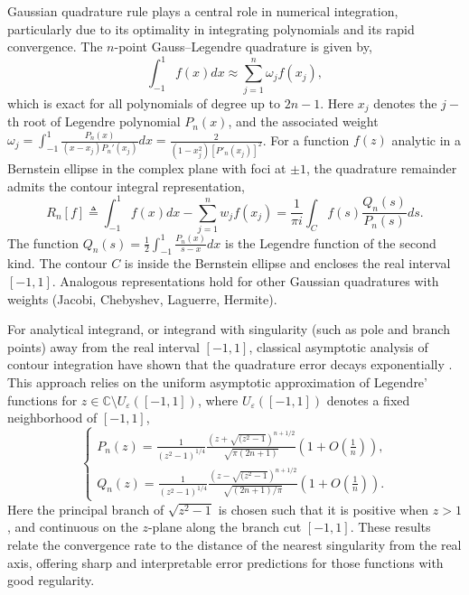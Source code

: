 \documentclass[11pt]{article}
\begin{document}
Gaussian quadrature rule plays a central role in numerical integration, particularly due to its optimality in integrating polynomials and its rapid convergence. The $n$-point Gauss--Legendre quadrature is given by,
\begin{equation}
    \int_{-1}^1 f(x) dx \approx \sum_{j=1}^n \omega_j f(x_j),
\end{equation}
which is exact for all polynomials of degree up to $2n-1$. Here $x_j$ denotes the $j-$th root of Legendre polynomial $P_n(x)$, and the associated weight $\omega_j = \int_{-1}^1 \frac{P_n(x)}{(x - x_j) P_n'(x_j)} dx =  \frac{2}{(1-x_j^2)[P'_n(x_j)]^2}$. For a function $f(z)$ analytic in a Bernstein ellipse in the complex plane with foci at $\pm 1$, the quadrature remainder admits the contour integral representation,
\begin{equation}
R_n[f] \triangleq \int_{-1}^1 f(x) dx - \sum_{j=1}^n w_j f(x_j) = \frac{1}{\pi i} \int_C f(s) \frac{Q_n(s)}{P_n(s)} ds. \label{Gauss_Error_Contour}
\end{equation}
The function $Q_n(s) = \frac{1}{2} \int_{-1}^1 \frac{P_n(x)}{s - x} dx$ is the Legendre function of the second kind. The contour $C$ is inside the Bernstein ellipse and encloses the real interval $[-1,1]$. Analogous representations hold for other Gaussian quadratures with weights (Jacobi, Chebyshev, Laguerre, Hermite). 


For analytical integrand, or integrand with singularity (such as pole and branch points) away from the real interval $[-1,1]$, classical asymptotic analysis of contour integration have shown that the quadrature error decays exponentially \cite{barrett1961convergence, chawla1968asymptotic, chawla1969davis, gautschi1983error}. This approach relies on the uniform asymptotic approximation of Legendre' functions for $ z \in \mathbb{C} \setminus U_\varepsilon([-1,1]) $, where $ U_\varepsilon([-1,1])$ denotes a fixed neighborhood of $[-1,1]$,
\begin{equation}
\begin{cases}
    P_n(z) = \frac{1}{(z^2-1)^{1/4}}  \frac{(z + \sqrt{(z^2-1})^{n+1/2}}{\sqrt{\pi( 2n+1)}} \left( 1 + O(\frac{1}{n}) \right),\\ 
    Q_n(z) = \frac{1}{(z^2-1)^{1/4}}  \frac{(z - \sqrt{(z^2-1})^{n+1/2}}{\sqrt{( 2n+1)/\pi}} \left( 1 + O(\frac{1}{n}) \right).\label{PQ_large}
\end{cases}
\end{equation}
Here the principal branch of $\sqrt{z^2-1}$ is chosen such that it is positive when $z>1$, and continuous on the $z$-plane along the branch cut $[-1,1]$. These results relate the convergence rate to the distance of the nearest singularity from the real axis, offering sharp and interpretable error predictions for those functions with good regularity.
\end{document}
